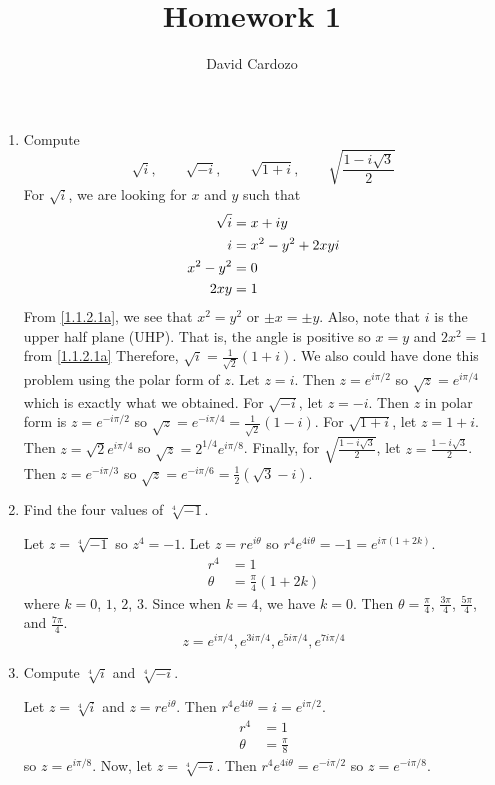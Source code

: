 \documentclass[notitlepage]{report}
\author{David Cardozo}
\title{Homework 1}
\begin{document}
	\maketitle
	
	

	
	\begin{enumerate}
		\item
		Compute
		\[
		\sqrt{i}, \qquad \sqrt{-i}, \qquad \sqrt{1 + i}, \qquad
		\sqrt{\frac{1 - i\sqrt{3}}{2}}
		\]
		For \(\sqrt{i}\), we are looking for \(x\) and \(y\) such that
		\begin{align}
		\sqrt{i} & = x + iy\notag\\
		i & = x^2 - y^2 + 2xyi\notag\\
		x^2 - y^2 & = 0\label{1.1.2.1a}\\
		2xy & = 1\label{1.1.2.1b}
		\end{align}
		From \eqref{1.1.2.1a}, we see that \(x^2 = y^2\) or \(\pm x = \pm y\).
		Also, note that \(i\) is the upper half plane (UHP).
		That is, the angle is positive so \(x = y\) and \(2x^2 = 1\) from
		\eqref{1.1.2.1a}
		Therefore, \(\sqrt{i} = \frac{1}{\sqrt{2}}(1 + i)\).
		We also could have done this problem using the polar form of \(z\).
		Let \(z = i\).
		Then \(z = e^{i\pi/2}\) so \(\sqrt{z} = e^{i\pi/4}\) which is exactly what we
		obtained.
		For \(\sqrt{-i}\), let \(z = -i\).
		Then \(z\) in polar form is \(z = e^{-i\pi/2}\) so
		\(\sqrt{z} = e^{-i\pi/4} = \frac{1}{\sqrt{2}}(1 - i)\).
		For \(\sqrt{1 + i}\), let \(z = 1 + i\).
		Then \(z = \sqrt{2}e^{i\pi/4}\) so \(\sqrt{z} = 2^{1/4}e^{i\pi/8}\).
		Finally, for \(\sqrt{\frac{1 - i\sqrt{3}}{2}}\), let
		\(z = \frac{1 - i\sqrt{3}}{2}\).
		Then \(z = e^{-i\pi/3}\) so
		\(\sqrt{z} = e^{-i\pi/6} = \frac{1}{2}(\sqrt{3} - i)\).
		\item
		Find the four values of \(\sqrt[4]{-1}\).
		\par\smallskip
		Let \(z = \sqrt[4]{-1}\) so \(z^4 = -1\).
		Let \(z = re^{i\theta}\) so \(r^4e^{4i\theta} = -1 = e^{i\pi(1 + 2k)}\).
		\begin{align*}
		r^4 & = 1\\
		\theta & = \frac{\pi}{4}(1 + 2k)
		\end{align*}
		where \(k = 0\), \(1\), \(2\), \(3\).
		Since when \(k = 4\), we have \(k = 0\).
		Then \(\theta = \frac{\pi}{4}\), \(\frac{3\pi}{4}\), \(\frac{5\pi}{4}\),
		and \(\frac{7\pi}{4}\).
		\[
		z = e^{i\pi/4}, e^{3i\pi/4}, e^{5i\pi/4}, e^{7i\pi/4}
		\]
		\item
		Compute \(\sqrt[4]{i}\) and \(\sqrt[4]{-i}\).
		\par\smallskip
		Let \(z = \sqrt[4]{i}\) and \(z = re^{i\theta}\).
		Then \(r^4e^{4i\theta} = i = e^{i\pi/2}\).
		\begin{align*}
		r^4 & = 1\\
		\theta & = \frac{\pi}{8}
		\end{align*}
		so \(z = e^{i\pi/8}\).
		Now, let \(z = \sqrt[4]{-i}\).
		Then \(r^4e^{4i\theta} = e^{-i\pi/2}\) so \(z = e^{-i\pi/8}\).
	\end{enumerate}
	
\end{document}
